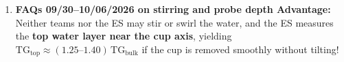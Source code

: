 \begin{quicksheet}
\begin{twocol}[0.49]
\begin{devicebox}
\begin{enumerate}
  \item \textbf{FAQs 09/30--10/06/2026 on stirring and probe depth Advantage:} Neither teams nor the ES may stir or swirl the water, and the ES measures the \textbf{top water layer near the cup axis}, yielding $\mathrm{TG}_{\mathrm{top}} \approx (1.25\text{--}1.40)\,\mathrm{TG}_{\mathrm{bulk}}$ if the cup is removed smoothly without tilting!
\end{enumerate}
\end{devicebox}
\end{twocol}
\end{quicksheet}

